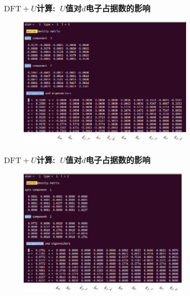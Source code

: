 \frame%
{
	\frametitle{$\mathrm{DFT}+U$计算:~$U$值对$d$电子占据数的影响}
\begin{figure}[h!]
	\vskip -12pt
\centering
\includegraphics[height=2.5in,viewport=0 0 700 515,clip]{Figures/NiO-LDA-onsit_matrix.png}
\caption{\fontsize{6.2pt}{5.2pt}}%
\label{NiO-LDA-onsite_matrix}
\end{figure}
}
\frame%
{
	\frametitle{$\mathrm{DFT}+U$计算:~$U$值对$d$电子占据数的影响}
\begin{figure}[h!]
	\vskip -12pt
\centering
\includegraphics[height=2.5in,viewport=0 0 700 525,clip]{Figures/NiO-LDA_U-onsit_matrix.png}
\caption{\fontsize{6.2pt}{5.2pt}}%
\label{NiO-LDA_U-onsite_matrix}
\end{figure}
}

